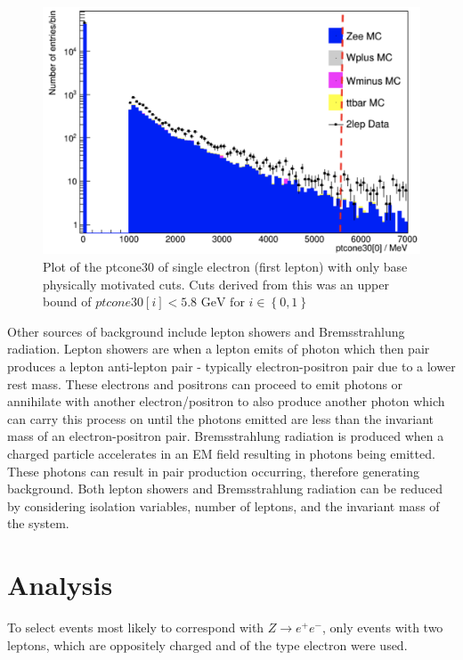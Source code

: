 \documentclass[%
 reprint,
 amsmath,amssymb,
 aps,
]{revtex4-2}
\begin{document}
\begin{figure}
    \centering
    \begin{minipage}{0.4\textwidth}
        \centering
        \includegraphics[width=\linewidth]{plots/ptcone_ee_nt.png}
    \end{minipage}
    \caption{Plot of the ptcone30 of single electron (first lepton) with only base physically motivated cuts.  Cuts derived from this was an upper bound of $ptcone30[i] < 5.8 \text{ GeV for } i \in \left\{ 0,1 \right\}$}
    \label{fig:ptcone_ee}
\end{figure}
Other sources of background include lepton showers and Bremsstrahlung radiation.  Lepton showers are when a lepton emits of photon which then pair produces a lepton anti-lepton pair - typically electron-positron pair due to a lower rest mass. These electrons and positrons can proceed to emit photons or annihilate with another electron/positron to also produce another photon which can carry this process on until the photons emitted are less than the invariant mass of an electron-positron pair. Bremsstrahlung radiation is produced when a charged particle accelerates in an EM field resulting in photons being emitted. These photons can result in pair production occurring, therefore generating background. Both lepton showers and Bremsstrahlung radiation can be reduced by considering isolation variables, number of leptons, and the invariant mass of the system.
\section{Analysis}
To select events most likely to correspond with $Z \rightarrow e^{+}e^{-}$, only events with two leptons, which are oppositely charged and of the type electron were used.
\end{document}

